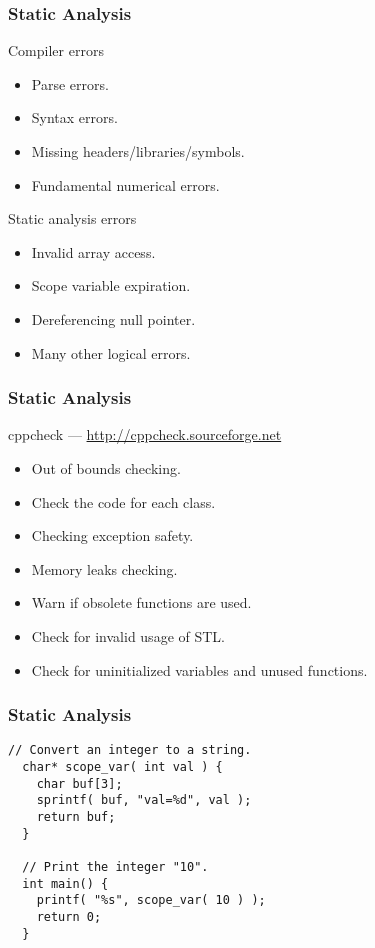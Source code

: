 \begin{frame}
  \frametitle{Static Analysis}
  \begin{block}{Compiler errors}
    \begin{itemize}
    \item Parse errors.
    \item Syntax errors.
    \item Missing headers/libraries/symbols.
    \item Fundamental numerical errors.
    \end{itemize}
  \end{block}
  \begin{block}{Static analysis errors}
    \begin{itemize}
    \item Invalid array access.
    \item Scope variable expiration.
    \item Dereferencing null pointer.
    \item Many other logical errors.
    \end{itemize}
  \end{block}
\end{frame}

\begin{frame}
  \frametitle{Static Analysis}
  cppcheck --- {\color{Base0D}\url{http://cppcheck.sourceforge.net}}
  \begin{itemize}
  \item Out of bounds checking.
  \item Check the code for each class.
  \item Checking exception safety.
  \item Memory leaks checking.
  \item Warn if obsolete functions are used.
  \item Check for invalid usage of STL.
  \item Check for uninitialized variables and unused functions.
  \end{itemize}
\end{frame}

\begin{frame}[fragile]
  \frametitle{Static Analysis}
  \begin{example}
    \begin{lstlisting}[style=C]
  // Convert an integer to a string.
  char* scope_var( int val ) {
    char buf[3];
    sprintf( buf, "val=%d", val );
    return buf;
  }

  // Print the integer "10".
  int main() {
    printf( "%s", scope_var( 10 ) );
    return 0;
  }
    \end{lstlisting}
  \end{example}
\end{frame}

